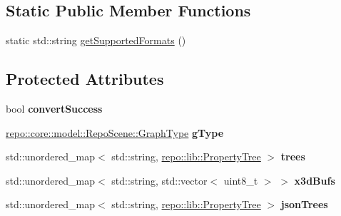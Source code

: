 \subsection*{Static Public Member Functions}
\begin{DoxyCompactItemize}
\item 
static std\+::string \hyperlink{classrepo_1_1manipulator_1_1modelconvertor_1_1_web_model_export_af6a4e5186a24090b1b7ee48cbdda0ce9}{get\+Supported\+Formats} ()
\end{DoxyCompactItemize}
\subsection*{Protected Attributes}
\begin{DoxyCompactItemize}
\item 
\hypertarget{classrepo_1_1manipulator_1_1modelconvertor_1_1_web_model_export_a72e7693f58cff85bc1aeffeed5783b4e}{}bool {\bfseries convert\+Success}\label{classrepo_1_1manipulator_1_1modelconvertor_1_1_web_model_export_a72e7693f58cff85bc1aeffeed5783b4e}

\item 
\hypertarget{classrepo_1_1manipulator_1_1modelconvertor_1_1_web_model_export_a63ff812eb4ab1186b9b3ea65b5fb5727}{}\hyperlink{classrepo_1_1core_1_1model_1_1_repo_scene_aefcacd6eb4c7774ac1bfe3a6b223337c}{repo\+::core\+::model\+::\+Repo\+Scene\+::\+Graph\+Type} {\bfseries g\+Type}\label{classrepo_1_1manipulator_1_1modelconvertor_1_1_web_model_export_a63ff812eb4ab1186b9b3ea65b5fb5727}

\item 
\hypertarget{classrepo_1_1manipulator_1_1modelconvertor_1_1_web_model_export_a0adc529948d18959652955e5de28d2ab}{}std\+::unordered\+\_\+map$<$ std\+::string, \hyperlink{classrepo_1_1lib_1_1_property_tree}{repo\+::lib\+::\+Property\+Tree} $>$ {\bfseries trees}\label{classrepo_1_1manipulator_1_1modelconvertor_1_1_web_model_export_a0adc529948d18959652955e5de28d2ab}

\item 
\hypertarget{classrepo_1_1manipulator_1_1modelconvertor_1_1_web_model_export_a56ad22341ac91a135104b3ee666623e0}{}std\+::unordered\+\_\+map$<$ std\+::string, std\+::vector$<$ uint8\+\_\+t $>$ $>$ {\bfseries x3d\+Bufs}\label{classrepo_1_1manipulator_1_1modelconvertor_1_1_web_model_export_a56ad22341ac91a135104b3ee666623e0}

\item 
\hypertarget{classrepo_1_1manipulator_1_1modelconvertor_1_1_web_model_export_a255c9dc7ba9db65a72c716015ab855b7}{}std\+::unordered\+\_\+map$<$ std\+::string, \hyperlink{classrepo_1_1lib_1_1_property_tree}{repo\+::lib\+::\+Property\+Tree} $>$ {\bfseries json\+Trees}\label{classrepo_1_1manipulator_1_1modelconvertor_1_1_web_model_export_a255c9dc7ba9db65a72c716015ab855b7}

\end{DoxyCompactItemize}


